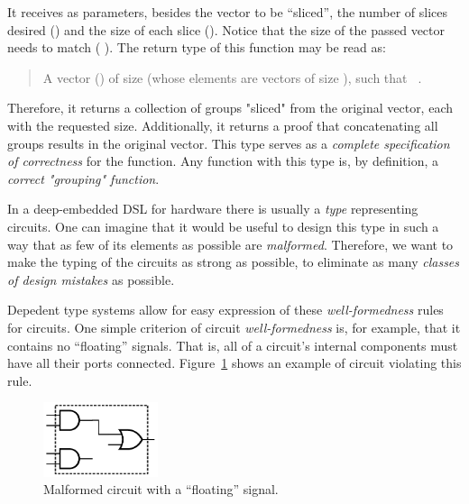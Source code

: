     \begin{listing}[h]
    \end{listing}

    It receives as parameters, besides the vector to be ``sliced'',
    the number of slices desired () and the size of each slice ().
    Notice that the size of the passed vector needs to match ( \AF{*} ).
    The return type of this function may be read as:
    \begin{quote}
        A vector () of size  (whose elements are vectors of size ),
        such that \texttt{   }.
    \end{quote}

    Therefore, it returns a collection of groups "sliced" from the original vector, each with the requested size.
    Additionally, it returns a proof that concatenating all groups results in the original vector.
    This type serves as a \emph{complete specification of correctness} for the function.
    Any function with this type is, by definition, a \emph{correct "grouping" function}.

    In a deep-embedded \acs{DSL} for hardware there is usually a \emph{type} representing circuits.
    One can imagine that it would be useful to design this type
    in such a way that as few of its elements as possible are \emph{malformed}.
    Therefore, we want to make the typing of the circuits as strong as possible,
    to eliminate as many \emph{classes of design mistakes} as possible.

    Depedent type systems allow for easy expression of these \emph{well-formedness} rules for circuits.
    One simple criterion of circuit \emph{well-formedness} is, for example, that it contains no ``floating'' signals.
    That is, all of a circuit's internal components must have all their ports connected.
    Figure~\ref{fig:floating-wire} shows an example of circuit violating this rule.

    \begin{figure}[h]
        \centerline{\includegraphics[width=0.3\textwidth]{imgs/floating-wire.pdf}}
        \caption{Malformed circuit with a ``floating'' signal. \label{fig:floating-wire}}
    \end{figure}

